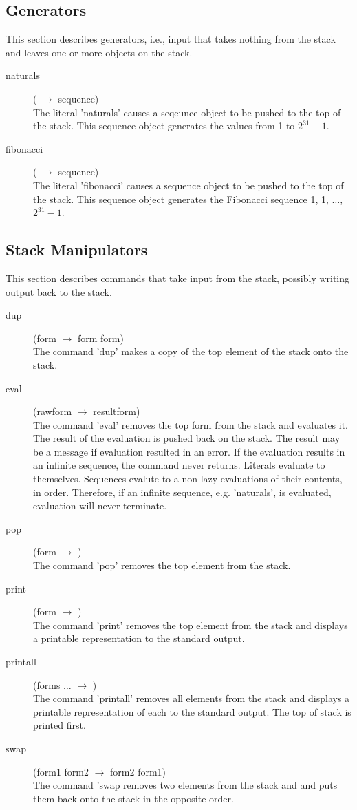 \documentclass[12pt]{article}
\newcommand{\stackcmd}[3]{\item[{#1}] \hfill ({#2} $\rightarrow{}$ {#3}) \\}
\begin{document}
\subsection*{Generators}

This section describes generators, i.e., input that takes nothing from
the stack and leaves one or more objects on the stack.

\begin{description}

\stackcmd{naturals}{}{sequence} The literal 'naturals' causes a
seqeunce object to be pushed to the top of the stack.  This sequence
object generates the values from 1 to $2^{31}-1$.

\stackcmd{fibonacci}{}{sequence}  The literal 'fibonacci' causes a
sequence object to be pushed to the top of the stack.  This sequence
object generates the Fibonacci sequence 1, 1, $\dots$, $2^{31}-1$.

\end{description}

\subsection*{Stack Manipulators}

This section describes commands that take input from the stack,
possibly writing output back to the stack.

\begin{description}

\stackcmd{dup}{form}{form form}  The command 'dup' makes a copy of the
top element of the stack onto the stack.

\stackcmd{eval}{raw\-form}{result\-form}  The command 'eval' removes
the top form from the stack and evaluates it.  The result of the
evaluation is pushed back on the stack.  The result may be a message
if evaluation resulted in an error.  If the evaluation results in an
infinite sequence, the command never returns.  Literals evaluate to
themselves.  Sequences evalute to a non-lazy evaluations of their
contents, in order.  Therefore, if an infinite sequence,
e.g. 'naturals', is evaluated, evaluation will never terminate.

\stackcmd{pop}{form}{} The command 'pop' removes the top element from
the stack.

\stackcmd{print}{form}{} The command 'print' removes the top element
from the stack and displays a printable representation to the standard
output.

\stackcmd{printall}{forms $\dots$}{} The command 'printall' removes
all elements from the stack and displays a printable representation of
each to the standard output.  The top of stack is printed first.

\stackcmd{swap}{form1 form2}{form2 form1} The command 'swap removes
two elements from the stack and and puts them back onto the stack in
the opposite order.

\end{description}
\end{document}
